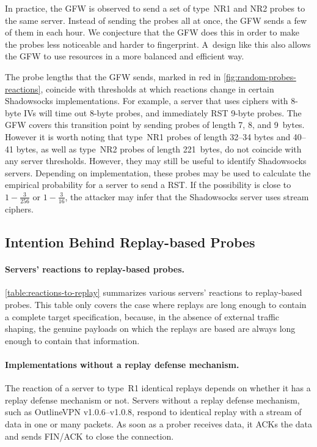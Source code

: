 \documentclass[sigconf,letterpaper]{acmart}
\begin{document}
In practice, the GFW is observed to send a set of type~NR1 and NR2 probes to the same server.
Instead of sending the probes all at once,
the GFW sends a few of them in each hour.
We conjecture that the GFW does this in order to make the probes less noticeable and harder to fingerprint.
A~design like this also allows the GFW to use resources in a more balanced and efficient way.

The probe lengths that the GFW sends, marked in red in \autoref{fig:random-probes-reactions},
coincide with thresholds at which reactions change in certain Shadowsocks implementations.
For example, a server that uses ciphers with 8-byte IVs will time out 8-byte probes, and immediately RST 9-byte probes.
The GFW covers this transition point by sending probes of length 7, 8, and 9~bytes.
However it is worth noting that
type~NR1 probes of length 32--34 bytes and 40--41 bytes, as well as type~NR2 probes of length 221~bytes,
do not coincide with any server thresholds.
However, they may still be useful to identify Shadowsocks servers.
Depending on implementation,
these probes may be used to calculate the empirical probability for a server to send a RST.
If the possibility is close to $1 - \frac{3}{256}$ or $1 - \frac{3}{16}$,
the attacker may infer that the Shadowsocks server uses stream ciphers.

\subsection{Intention Behind Replay-based Probes}
\label{sec:probe-types-replay}

\paragraph{Servers' reactions to replay-based probes.}

\autoref{table:reactions-to-replay} summarizes various servers' reactions to replay-based probes.
This table only covers the case where replays are long enough to contain a complete target specification,
because,
in the absence of external traffic shaping,
the genuine payloads on which the replays are based
are always long enough to contain that information.

\paragraph{Implementations without a replay defense mechanism.}
The reaction of a server to type~R1 identical replays depends on whether it has a replay defense mechanism or not.
Servers without a replay defense mechanism, such as OutlineVPN v1.0.6--v1.0.8,
respond to identical replay with a stream of data in one or many packets.
As soon as a prober receives data,
it ACKs the data and sends FIN/ACK to close the connection.
\end{document}
